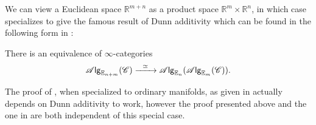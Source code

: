 \documentclass[../text.tex]{subfiles}
\begin{document}
\begin{example}
    We can view a Euclidean space $\mathbb{R}^{m+n}$ as a product space $\mathbb{R}^m \times \mathbb{R}^n$, in which case  specializes to give the famous result of Dunn additivity \cite{dunn1988} which can be found in the following form in \cite{lurie_ha}:
    \begin{corollary}\label{prop:dunn_additivity}
        There is an equivalence of $\infty$-categories
        \begin{equation}
            \mathscr{A} \mathsf{lg}_{\mathbb{E}_{n + m}} (\mathscr{C}) \xrightarrow{\ \ \simeq \ \ } \mathscr{A} \mathsf{lg}_{\mathbb{E}_n} (\mathscr{A} \mathsf{lg}_{\mathbb{E}_m} (\mathscr{C})).
        \end{equation}
    \end{corollary}
\end{example}

\begin{remark}
    The proof of , when specialized to ordinary manifolds, as given in \cite{ginot2015} actually depends on Dunn additivity to work, however the proof presented above and the one in \cite{lurie_ha} are both independent of this special case. 
\end{remark}
\end{document}
